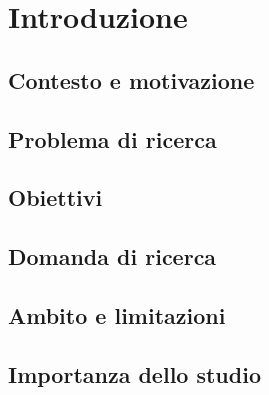 \chapter{Introduzione}
    \section{Contesto e motivazione}
    \section{Problema di ricerca}
    \section{Obiettivi}
    \section{Domanda di ricerca}
    \section{Ambito e limitazioni}
    \section{Importanza dello studio}

\cleardoublepage